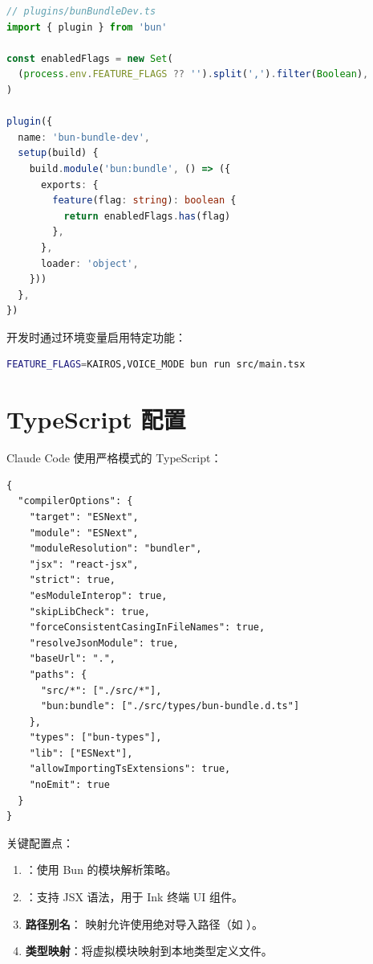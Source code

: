 \begin{lstlisting}[language=TypeScript,breaklines=true]
// plugins/bunBundleDev.ts
import { plugin } from 'bun'

const enabledFlags = new Set(
  (process.env.FEATURE_FLAGS ?? '').split(',').filter(Boolean),
)

plugin({
  name: 'bun-bundle-dev',
  setup(build) {
    build.module('bun:bundle', () => ({
      exports: {
        feature(flag: string): boolean {
          return enabledFlags.has(flag)
        },
      },
      loader: 'object',
    }))
  },
})
\end{lstlisting}

开发时通过环境变量启用特定功能：

\begin{lstlisting}[language=bash,breaklines=true]
FEATURE_FLAGS=KAIROS,VOICE_MODE bun run src/main.tsx
\end{lstlisting}

\section{TypeScript 配置}

Claude Code 使用严格模式的 TypeScript：

\begin{lstlisting}[breaklines=true]
{
  "compilerOptions": {
    "target": "ESNext",
    "module": "ESNext",
    "moduleResolution": "bundler",
    "jsx": "react-jsx",
    "strict": true,
    "esModuleInterop": true,
    "skipLibCheck": true,
    "forceConsistentCasingInFileNames": true,
    "resolveJsonModule": true,
    "baseUrl": ".",
    "paths": {
      "src/*": ["./src/*"],
      "bun:bundle": ["./src/types/bun-bundle.d.ts"]
    },
    "types": ["bun-types"],
    "lib": ["ESNext"],
    "allowImportingTsExtensions": true,
    "noEmit": true
  }
}
\end{lstlisting}

关键配置点：

\begin{enumerate}[nosep]
  \item \textbf{}：使用 Bun 的模块解析策略。
  \item \textbf{}：支持 JSX 语法，用于 Ink 终端 UI 组件。
  \item \textbf{路径别名}： 映射允许使用绝对导入路径（如 ）。
  \item \textbf{ 类型映射}：将虚拟模块映射到本地类型定义文件。
\end{enumerate}

